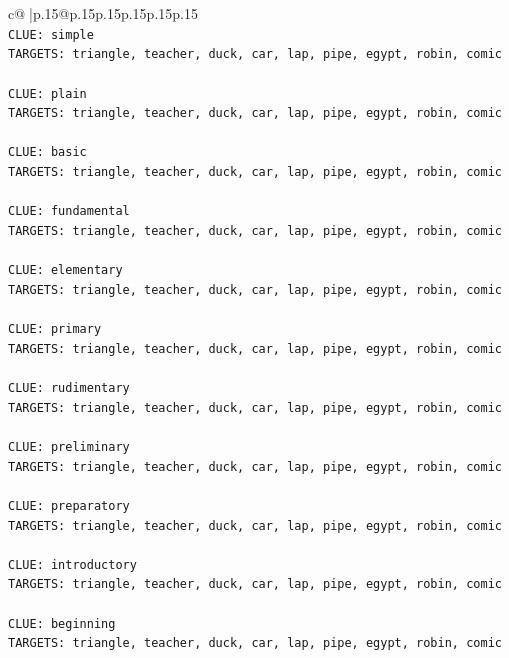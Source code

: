 \documentclass{article}
\begin{document}
{\begin{supertabular}{c@{$\;$}|p{.15\linewidth}@{}p{.15\linewidth}p{.15\linewidth}p{.15\linewidth}p{.15\linewidth}p{.15\linewidth}}
{{{\\ 
\texttt{CLUE: simple} \\
\texttt{TARGETS: triangle, teacher, duck, car, lap, pipe, egypt, robin, comic} \\
\\ 
\texttt{CLUE: plain} \\
\texttt{TARGETS: triangle, teacher, duck, car, lap, pipe, egypt, robin, comic} \\
\\ 
\texttt{CLUE: basic} \\
\texttt{TARGETS: triangle, teacher, duck, car, lap, pipe, egypt, robin, comic} \\
\\ 
\texttt{CLUE: fundamental} \\
\texttt{TARGETS: triangle, teacher, duck, car, lap, pipe, egypt, robin, comic} \\
\\ 
\texttt{CLUE: elementary} \\
\texttt{TARGETS: triangle, teacher, duck, car, lap, pipe, egypt, robin, comic} \\
\\ 
\texttt{CLUE: primary} \\
\texttt{TARGETS: triangle, teacher, duck, car, lap, pipe, egypt, robin, comic} \\
\\ 
\texttt{CLUE: rudimentary} \\
\texttt{TARGETS: triangle, teacher, duck, car, lap, pipe, egypt, robin, comic} \\
\\ 
\texttt{CLUE: preliminary} \\
\texttt{TARGETS: triangle, teacher, duck, car, lap, pipe, egypt, robin, comic} \\
\\ 
\texttt{CLUE: preparatory} \\
\texttt{TARGETS: triangle, teacher, duck, car, lap, pipe, egypt, robin, comic} \\
\\ 
\texttt{CLUE: introductory} \\
\texttt{TARGETS: triangle, teacher, duck, car, lap, pipe, egypt, robin, comic} \\
\\ 
\texttt{CLUE: beginning} \\
\texttt{TARGETS: triangle, teacher, duck, car, lap, pipe, egypt, robin, comic} \\
\\ 
}}}
\end{supertabular}}
\end{document}
